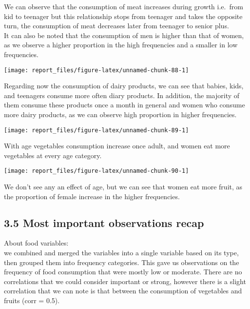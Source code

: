 \documentclass[
]{article}
\begin{document}
We can observe that the consumption of meat increases during growth
i.e.~from kid to teenager but this relationship stops from teenager and
takes the opposite turn, the consumption of meat decreases later from
teenager to senior plus.\\
It can also be noted that the consumption of men is higher than that of
women, as we observe a higher proportion in the high frequencies and a
smaller in low frequencies.

\begin{center}\texttt{[image: report\_files/figure-latex/unnamed-chunk-88-1]} \end{center}

Regarding now the consumption of dairy products, we can see that babies,
kids, and teenagers consume more often diary products. In addition, the
majority of them consume these products once a month in general and
women who consume more dairy products, as we can observe high proportion
in higher frequencies.

\begin{center}\texttt{[image: report\_files/figure-latex/unnamed-chunk-89-1]} \end{center}

With age vegetables consumption increase once adult, and women eat more
vegetables at every age category.

\begin{center}\texttt{[image: report\_files/figure-latex/unnamed-chunk-90-1]} \end{center}

We don't see any an effect of age, but we can see that women eat more
fruit, as the proportion of female increase in the higher frequencies.

\hypertarget{most-important-observations-recap}{%
\subsection{3.5 Most important observations
recap}\label{most-important-observations-recap}}

About food variables:\\
we combined and merged the variables into a single variable based on its
type, then grouped them into frequency categories. This gave us
observations on the frequency of food consumption that were mostly low
or moderate. There are no correlations that we could consider important
or strong, however there is a slight correlation that we can note is
that between the consumption of vegetables and fruits (corr = 0.5).
\end{document}
